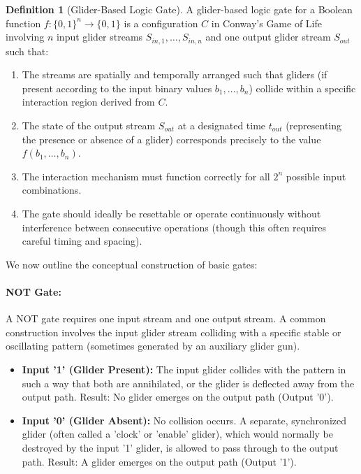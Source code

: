 \documentclass{article}
\theoremstyle{definition}
\newtheorem{definition}{Definition}[section]
\theoremstyle{plain}
\theoremstyle{plain}
\begin{document}
\begin{definition}[Glider-Based Logic Gate]
A glider-based logic gate for a Boolean function $f: \{0, 1\}^n \to \{0, 1\}$ is a configuration $C$ in Conway's Game of Life involving $n$ input glider streams $S_{in,1}, \dots, S_{in,n}$ and one output glider stream $S_{out}$ such that:
\begin{enumerate}
  \item The streams are spatially and temporally arranged such that gliders (if present according to the input binary values $b_1, \dots, b_n$) collide within a specific interaction region derived from $C$.
  \item The state of the output stream $S_{out}$ at a designated time $t_{out}$ (representing the presence or absence of a glider) corresponds precisely to the value $f(b_1, \dots, b_n)$.
  \item The interaction mechanism must function correctly for all $2^n$ possible input combinations.
  \item The gate should ideally be resettable or operate continuously without interference between consecutive operations (though this often requires careful timing and spacing).
\end{enumerate}
\end{definition}

We now outline the conceptual construction of basic gates:

\paragraph{NOT Gate:} A NOT gate requires one input stream and one output stream. A common construction involves the input glider stream colliding with a specific stable or oscillating pattern (sometimes generated by an auxiliary glider gun).
\begin{itemize}
  \item \textbf{Input '1' (Glider Present):} The input glider collides with the pattern in such a way that both are annihilated, or the glider is deflected away from the output path. Result: No glider emerges on the output path (Output '0').
  \item \textbf{Input '0' (Glider Absent):} No collision occurs. A separate, synchronized glider (often called a 'clock' or 'enable' glider), which would normally be destroyed by the input '1' glider, is allowed to pass through to the output path. Result: A glider emerges on the output path (Output '1').
\end{itemize}
\end{document}
